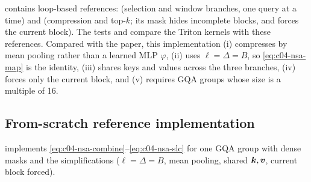 \begin{implnote}[title={In the code: reference version, tests, and differences from the paper}]
 contains
loop-based references:  (selection and window branches, one query at a time) and
 (compression and top-$k$; its mask 
hides incomplete blocks, and  forces the current block). The tests
 and
 compare the
Triton kernels with these references. Compared with the paper, this implementation
(i) compresses by mean pooling rather than a learned MLP $\varphi$, (ii) uses $\ell=\Delta=B$,
so \eqref{eq:c04-nsa-map} is the identity, (iii) shares keys and values across the three branches,
(iv) forces only the current block, and (v) requires GQA groups whose size is a multiple of 16.
\end{implnote}

\subsection{From-scratch reference implementation}

 implements \eqref{eq:c04-nsa-combine}--\eqref{eq:c04-nsa-slc} for one GQA
group with dense masks and the \fla{} simplifications ($\ell=\Delta=B$, mean pooling, shared
$\bm{k},\bm{v}$, current block forced).

